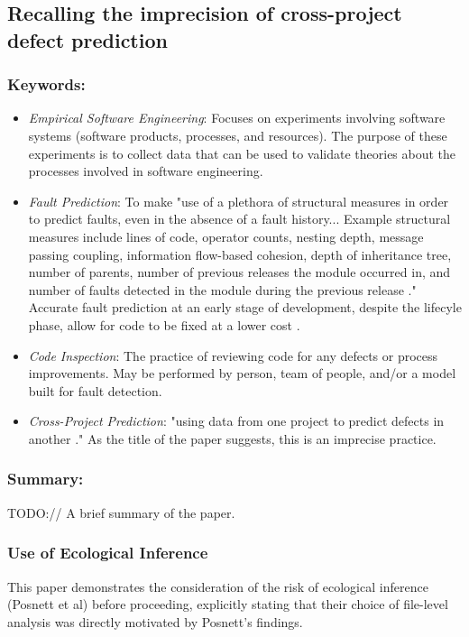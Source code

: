 \documentclass{sig-alternate-05-2015}
\begin{document}
\subsection{Recalling the imprecision of cross-project defect prediction \cite{Rahman:2012}}

\subsubsection{Keywords:}
\begin{itemize}
\item \emph{Empirical Software Engineering}: Focuses on experiments involving software systems (software products, processes, and resources). The purpose of these experiments is to collect data that can be used to validate theories about the processes involved in software engineering.
\item \emph{Fault Prediction}: To make "use of a plethora of structural measures in order to predict faults, even in the absence of a fault history... Example structural measures include lines of code, operator counts, nesting depth, message passing coupling, information flow-based cohesion, depth of inheritance tree, number of parents, number of previous releases the module occurred in, and number of faults detected in the module during the previous release \cite{Binkley:2007}." Accurate fault prediction at an early stage of development, despite the lifecyle phase, allow for code to be fixed at a lower cost \cite{Binkley:2007}.
\item \emph{Code Inspection}: The practice of reviewing code for any defects or process improvements. May be performed by person, team of people, and/or a model built for fault detection.
\item \emph{Cross-Project Prediction}: "using data from one project to predict defects in another \cite{Rahman:2012}." As the title of the paper suggests, this is an imprecise practice.
\end{itemize} 

\subsubsection{Summary:}
TODO:// A brief summary of the paper.

\subsubsection{Use of Ecological Inference}
This paper demonstrates the consideration of the risk of ecological inference (Posnett et al) before proceeding, explicitly stating that their choice of file-level analysis was directly motivated by Posnett's findings.
\end{document}
